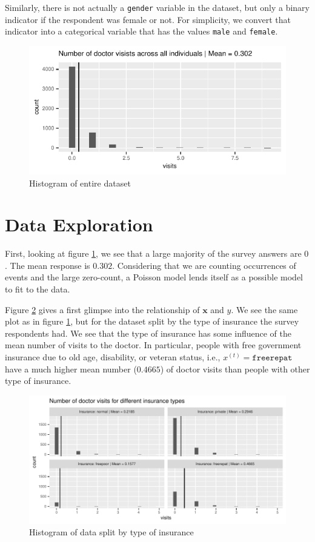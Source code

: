 \documentclass[a4paper,11pt]{article}
\begin{document}
Similarly, there is not actually a \texttt{gender} variable in the dataset, but only a binary indicator if the respondent was female or not. For simplicity, we convert that indicator into a categorical variable that has the values \texttt{male} and \texttt{female}.
\begin{figure}[h]
	\centering
	\includegraphics{../plots/histogram_of_visits.pdf}
	\caption{Histogram of entire dataset}
	\label{fig:hist_all}
\end{figure}

\section{Data Exploration}
First, looking at figure \ref{fig:hist_all}, we see that a large majority of the survey answers are $0$. The mean response is $0.302$. Considering that we are counting occurrences of events and the large zero-count, a Poisson model lends itself as a possible model to fit to the data. 

Figure \ref{fig:hist_insurances} gives a first glimpse into the relationship of $\mathbf{x}$ and $y$. We see the same plot as in figure \ref{fig:hist_all}, but for the dataset split by the type of insurance the survey respondents had. We see that the type of insurance has some influence of the mean number of visits to the doctor. In particular, people with free government insurance due to old age, disability, or veteran status, i.e., $x^{(t)} = \texttt{freerepat}$ have a much higher mean number ($0.4665$) of doctor visits than people with other type of insurance. 

\begin{figure}[h]
	\centering
\includegraphics{../plots/histograms_of_insurances.pdf}
		\caption{Histogram of data split by type of insurance}
			\label{fig:hist_insurances}
\end{figure}
\end{document}
